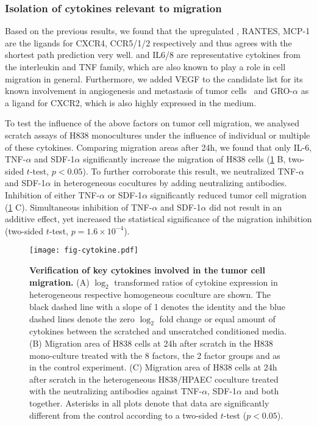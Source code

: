 \subsubsection{Isolation of cytokines relevant to migration}

Based on the previous results, 
we found that the upregulated \sdfonea,
RANTES, MCP-1 are the ligands for CXCR4, CCR5/1/2 respectively and thus agrees
with the shortest path prediction very well. \tnfa and IL6/8 are
representative cytokines from the interleukin and TNF
family, which are also known to play a role
in cell migration in general.
Furthermore, we added VEGF to the candidate list for its known involvement in
angiogenesis and metastasis of tumor cells~\citep{Ferrara2003,Hiratsuka2002} and GRO-$\alpha$ as a ligand for CXCR2, which is also highly expressed in the medium.

To test the influence of the above factors on tumor cell migration,
we analysed scratch assays of H838 monocultures under the influence of 
individual or multiple of these cytokines. 
Comparing migration areas after 24h, 
we found that only IL-6, TNF-$\alpha$ and SDF-1$\alpha$ significantly 
increase the migration of H838 cells (\ref{fig:cytokine} B, two-sided $t$-test,
$p < 0.05$). 
To further corroborate this result, we neutralized 
TNF-$\alpha$ and SDF-1$\alpha$ in heterogeneous cocultures  by adding neutralizing antibodies.
Inhibition of  either TNF-$\alpha$ or SDF-1$\alpha$ significantly reduced tumor cell migration (\ref{fig:cytokine} C). 
Simultaneous inhibition of TNF-$\alpha$ and SDF-1$\alpha$ did not result in an additive effect, yet increased the statistical significance of the migration 
inhibition
(two-sided $t$-test, $p=1.6\times10^{-4}$).

\begin{figure}
\begin{center}
\texttt{[image: fig-cytokine.pdf]}
\end{center}
\caption[Verification of key cytokines]{
{\bf Verification of key cytokines involved in the tumor cell migration.} 
(A) $\log_2$ transformed ratios of cytokine expression in heterogeneous respective
homogeneous coculture are shown. The black dashed line with a slope of 1 denotes 
the identity and the blue dashed lines denote the zero $\log_2$ fold change
or equal amount of cytokines between the scratched and unscratched conditioned 
media.
(B) Migration area of H838 cells at 24h after scratch in the H838 mono-culture 
treated with the 8
factors, the 2 factor groups and as in the control experiment.
(C) Migration area of H838 cells at 24h after scratch in the heterogeneous 
H838/HPAEC coculture 
treated with the neutralizing antibodies against TNF-$\alpha$, SDF-1$\alpha$
and both together. Asterisks in all plots denote that data are significantly 
different from the control according to a two-sided $t$-test ($p < 0.05$).
}
\label{fig:cytokine}
\end{figure}


